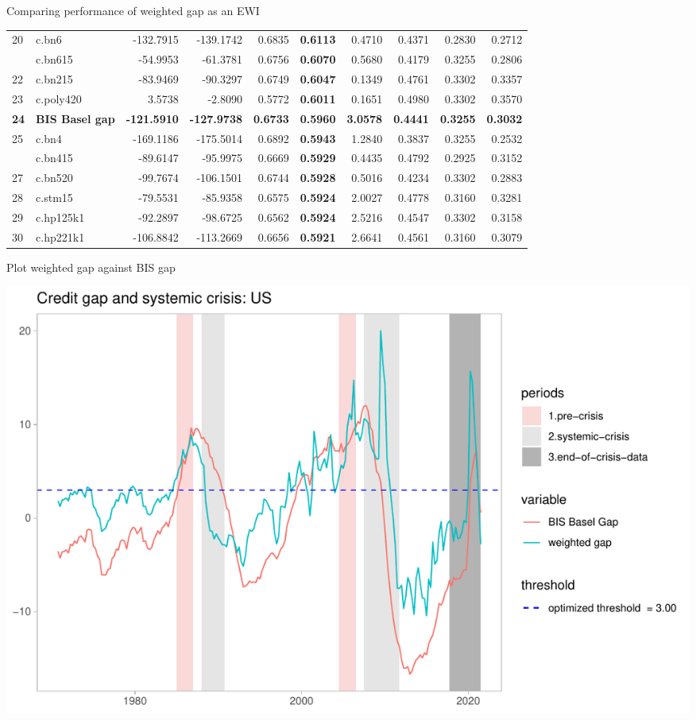 \documentclass[
  ignorenonframetext,
]{beamer}
\begin{document}
\begin{frame}{Comparing performance of weighted gap as an EWI}
{\begin{tabular}[t]{llrrr>{}rrrrr}
20 & c.bn6 & -132.7915 & -139.1742 & 0.6835 & \textbf{0.6113} & 0.4710 & 0.4371 & 0.2830 & 0.2712\\
\addlinespace
21 & c.bn615 & -54.9953 & -61.3781 & 0.6756 & \textbf{0.6070} & 0.5680 & 0.4179 & 0.3255 & 0.2806\\
22 & c.bn215 & -83.9469 & -90.3297 & 0.6749 & \textbf{0.6047} & 0.1349 & 0.4761 & 0.3302 & 0.3357\\
23 & c.poly420 & 3.5738 & -2.8090 & 0.5772 & \textbf{0.6011} & 0.1651 & 0.4980 & 0.3302 & 0.3570\\
\textbf{24} & \textbf{BIS Basel gap} & \textbf{-121.5910} & \textbf{-127.9738} & \textbf{0.6733} & \textbf{\textbf{0.5960}} & \textbf{3.0578} & \textbf{0.4441} & \textbf{0.3255} & \textbf{0.3032}\\
25 & c.bn4 & -169.1186 & -175.5014 & 0.6892 & \textbf{0.5943} & 1.2840 & 0.3837 & 0.3255 & 0.2532\\
\addlinespace
26 & c.bn415 & -89.6147 & -95.9975 & 0.6669 & \textbf{0.5929} & 0.4435 & 0.4792 & 0.2925 & 0.3152\\
27 & c.bn520 & -99.7674 & -106.1501 & 0.6744 & \textbf{0.5928} & 0.5016 & 0.4234 & 0.3302 & 0.2883\\
28 & c.stm15 & -79.5531 & -85.9358 & 0.6575 & \textbf{0.5924} & 2.0027 & 0.4778 & 0.3160 & 0.3281\\
29 & c.hp125k1 & -92.2897 & -98.6725 & 0.6562 & \textbf{0.5924} & 2.5216 & 0.4547 & 0.3302 & 0.3158\\
30 & c.hp221k1 & -106.8842 & -113.2669 & 0.6656 & \textbf{0.5921} & 2.6641 & 0.4561 & 0.3160 & 0.3079\\
\bottomrule
\end{tabular}}
\end{frame}

\begin{frame}{Plot weighted gap against BIS gap}
\protect\hypertarget{plot-weighted-gap-against-bis-gap}{}
\begin{center}\includegraphics[width=1\linewidth]{../Data/Output/Graphs/Weighted_credit_gap_US} \end{center}
\end{frame}
\end{document}
